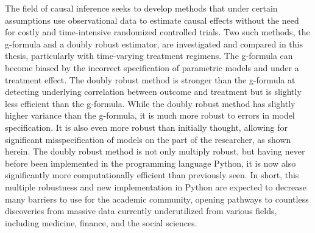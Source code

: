 
The field of causal inference seeks to develop methods that under certain assumptions use observational data to estimate causal effects without the need for costly and time-intensive randomized controlled trials.  Two such methods, the g-formula and a doubly robust estimator, are investigated and compared in this thesis, particularly with time-varying treatment regimens.  The g-formula can become biased by the incorrect specification of parametric models and under a treatment effect.  The doubly robust method is stronger than the g-formula at detecting underlying correlation between outcome and treatment but is slightly less efficient than the g-formula.  While the doubly robust method has slightly higher variance than the g-formula, it is much more robust to errors in model specification.  It is also even more robust than initially thought, allowing for significant misspecification of models on the part of the researcher, as shown herein.   The doubly robust method is not only multiply robust, but having never before been implemented in the programming language Python, it is now also significantly more computationally efficient than previously seen.  In short, this multiple robustness and new implementation in Python are expected to decrease many barriers to use for the academic community, opening pathways to countless discoveries from massive data currently underutilized from various fields, including medicine, finance, and the social sciences.  
